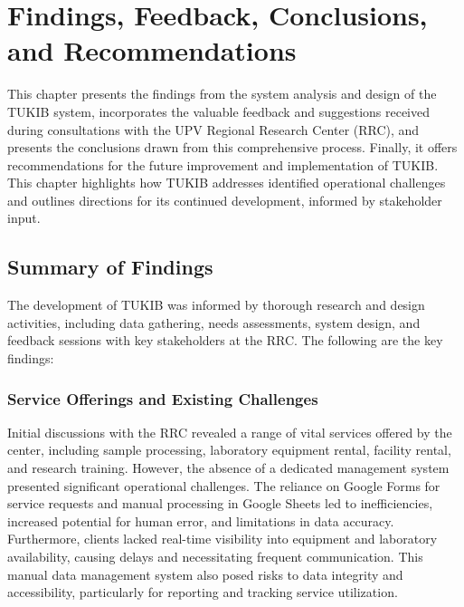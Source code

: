 \chapter{Findings, Feedback, Conclusions, and Recommendations}
This chapter presents the findings from the system analysis and design of the TUKIB system, incorporates the valuable feedback and suggestions received during consultations with the UPV Regional Research Center (RRC), and presents the conclusions drawn from this comprehensive process. Finally, it offers recommendations for the future improvement and implementation of TUKIB. This chapter highlights how TUKIB addresses identified operational challenges and outlines directions for its continued development, informed by stakeholder input.

\section{Summary of Findings}
The development of TUKIB was informed by thorough research and design activities, including data gathering, needs assessments, system design, and feedback sessions with key stakeholders at the RRC. The following are the key findings:

\subsection{Service Offerings and Existing Challenges}
Initial discussions with the RRC revealed a range of vital services offered by the center, including sample processing, laboratory equipment rental, facility rental, and research training. However, the absence of a dedicated management system presented significant operational challenges. The reliance on Google Forms for service requests and manual processing in Google Sheets led to inefficiencies, increased potential for human error, and limitations in data accuracy. Furthermore, clients lacked real-time visibility into equipment and laboratory availability, causing delays and necessitating frequent communication. This manual data management system also posed risks to data integrity and accessibility, particularly for reporting and tracking service utilization.

